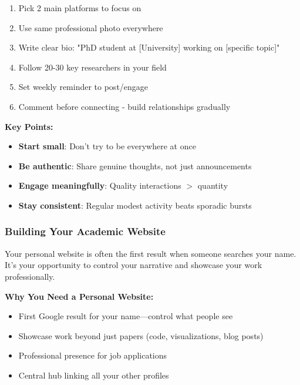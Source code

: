 \documentclass[11pt,a4paper]{article}
\begin{document}
\begin{tcolorbox}[colback=purple!5,colframe=purple!40,title={Quick Start Checklist}]
\begin{enumerate}
    \item Pick 2 main platforms to focus on
    \item Use same professional photo everywhere
    \item Write clear bio: "PhD student at [University] working on [specific topic]"
    \item Follow 20-30 key researchers in your field
    \item Set weekly reminder to post/engage
    \item Comment before connecting - build relationships gradually
\end{enumerate}

\textbf{Key Points:}
\begin{itemize}[leftmargin=1.5em]
    \item \textbf{Start small}: Don't try to be everywhere at once
    \item \textbf{Be authentic}: Share genuine thoughts, not just announcements
    \item \textbf{Engage meaningfully}: Quality interactions $>$ quantity
    \item \textbf{Stay consistent}: Regular modest activity beats sporadic bursts
\end{itemize}
\end{tcolorbox}

\subsubsection{Building Your Academic Website}

\begin{tcolorbox}[colback=green!5,colframe=green!50,title=Your Digital Academic Identity]
Your personal website is often the first result when someone searches your name. It's your opportunity to control your narrative and showcase your work professionally.
\end{tcolorbox}

\textbf{Why You Need a Personal Website:}
\begin{itemize}
    \item First Google result for your name—control what people see
    \item Showcase work beyond just papers (code, visualizations, blog posts)
    \item Professional presence for job applications
    \item Central hub linking all your other profiles
\end{itemize}
\end{document}
